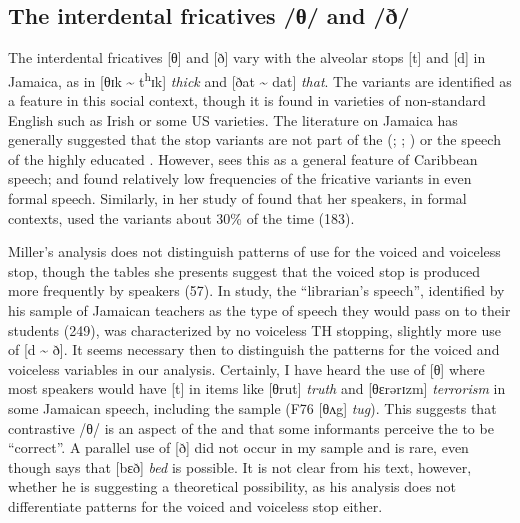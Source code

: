 \subsection{{The} {interdental} {fricatives} {/θ/} {and} {/ð/}}\label{sec:2.3.2}%
The interdental fricatives [θ] and [ð] vary with the alveolar stops [t] and [d] in Jamaica, as in [θɪk {\textasciitilde} t\textsuperscript{h}ɪk] \textit{thick} and [ðat {\textasciitilde} dat] \textit{that}.  The  variants are identified as a  feature in this social context, though it is found in varieties of non-standard English such as Irish or some US varieties.  The literature on Jamaica has generally suggested that the stop variants are not part of the  (\citealt[33]{Akers1981}; \citealt[23]{Meade2001}; \citealt[239]{Thaxter1977}) or the speech of the highly educated \citep[575]{Wells1982c}.  However, \citet[xlvi]{Allsopp1996} sees this as a general feature of Caribbean speech; and \citet[188]{Young1973} found relatively low frequencies of the fricative variants in even formal  speech.  Similarly, \citet{Miller1987} in her study of  found that her speakers, in formal contexts, used the  variants about 30\% of the time (183).

Miller's analysis does not distinguish patterns of use for the voiced and voiceless stop, though the tables she presents suggest that the voiced stop is produced more frequently by speakers (57).  In  study, the “librarian’s speech”, identified by his sample of Jamaican teachers as the type of speech they would pass on to their students (249), was characterized by no voiceless TH stopping, slightly more use of [d {\textasciitilde} ð].  It seems necessary then to distinguish the patterns for the voiced and voiceless variables in our analysis.  Certainly, I have heard the use of [θ] where most speakers would have [t] in items like [θrut] \textit{truth} and [θɛrǝrɪzm] \textit{terrorism} in some Jamaican speech, including the  sample (F76 [θʌg] \textit{tug}).  This suggests that contrastive /θ/ is an aspect of the  and that some informants perceive the  to be “correct”.  A parallel use of [ð] did not occur in my sample and is rare, even though \citet[565]{Wells1982c} says that [bɛð] \textit{bed} is possible.  It is not clear from his text, however, whether he is suggesting a theoretical possibility, as his analysis does not differentiate patterns for the voiced and voiceless stop either. 

